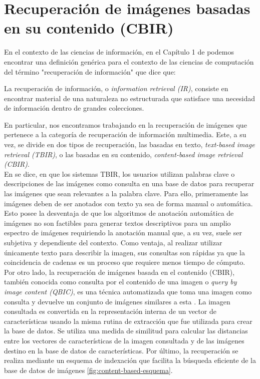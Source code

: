 \chapter{Recuperación de imágenes basadas en su contenido (CBIR)}\label{ch:CBIR}

En el contexto de las ciencias de información, en el Capítulo 1 de \cite{10.5555/1394399} podemos encontrar una definición genérica para el contexto de las ciencias de computación del término "recuperación de información" que dice que:

\begin{definicion}
La recuperación de información, o \emph{information retrieval (IR)}, consiste en encontrar material de una naturaleza no estructurada que satisface una necesidad de información dentro de grandes colecciones.
\end{definicion}

En particular, nos encontramos trabajando en la recuperación de imágenes que pertenece a la categoría de recuperación de información multimedia. Este, a su vez, se divide en dos tipos de recuperación, las basadas en texto, \emph{text-based image retrieval (TBIR)}, o las basadas en su contenido, \emph{content-based image retrieval (CBIR)}.\\

En \cite{content-based} se dice, en que los sistemas TBIR, los usuarios utilizan palabras clave o descripciones de las imágenes como consulta en una base de datos para recuperar las imágenes que sean relevantes a la palabra clave. Para ello, primeramente las imágenes deben de ser anotados con texto ya sea de forma manual o automática. Esto posee la desventaja de que los algoritmos de anotación automática de imágenes no son factibles para generar textos descriptivos para un amplio espectro de imágenes requiriendo la anotación manual que, a su vez, suele ser subjetiva y dependiente del contexto. Como ventaja, al realizar utilizar únicamente texto para describir la imagen, sus consultas son rápidas ya que la coincidencia de cadenas es un proceso que requiere menos tiempo de cómputo.\\

Por otro lado, la recuperación de imágenes basada en el contenido (CBIR), también conocida como consulta por el contenido de una imagen o \emph{query by image content (QBIC)}, es una técnica automatizada que toma una imagen como consulta y devuelve un conjunto de imágenes similares a esta \cite{content-based}. La imagen consultada es convertida en la representación interna de un vector de características usando la misma rutina de extracción que fue utilizada para crear la base de datos. Se utiliza una medida de similitud para calcular las distancias entre los vectores de características de la imagen consultada y de las imágenes destino en la base de datos de características. Por último, la recuperación se realiza mediante un esquema de indexación que facilita la búsqueda eficiente de la base de datos de imágenes \autoref{fig:content-based-esquema}.\\


